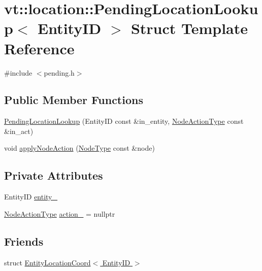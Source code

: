 \hypertarget{structvt_1_1location_1_1_pending_location_lookup}{}\section{vt\+:\+:location\+:\+:Pending\+Location\+Lookup$<$ Entity\+ID $>$ Struct Template Reference}
\label{structvt_1_1location_1_1_pending_location_lookup}


{\ttfamily \#include $<$pending.\+h$>$}

\subsection*{Public Member Functions}
\begin{DoxyCompactItemize}
\item 
\hyperlink{structvt_1_1location_1_1_pending_location_lookup_a31dee6a196bcc0fee50bdb983497b1f5}{Pending\+Location\+Lookup} (Entity\+ID const \&in\+\_\+entity, \hyperlink{namespacevt_1_1location_a3a9235e0ceb341bef225d2cc46606e9e}{Node\+Action\+Type} const \&in\+\_\+act)
\item 
void \hyperlink{structvt_1_1location_1_1_pending_location_lookup_a8e23682547f207d5403a0ee6a2224f37}{apply\+Node\+Action} (\hyperlink{namespacevt_a866da9d0efc19c0a1ce79e9e492f47e2}{Node\+Type} const \&node)
\end{DoxyCompactItemize}
\subsection*{Private Attributes}
\begin{DoxyCompactItemize}
\item 
Entity\+ID \hyperlink{structvt_1_1location_1_1_pending_location_lookup_ac35da0e44b6048e6cc893f1498f1aa1d}{entity\+\_\+}
\item 
\hyperlink{namespacevt_1_1location_a3a9235e0ceb341bef225d2cc46606e9e}{Node\+Action\+Type} \hyperlink{structvt_1_1location_1_1_pending_location_lookup_a601536844f9545be1cdf913fcd49d393}{action\+\_\+} = nullptr
\end{DoxyCompactItemize}
\subsection*{Friends}
\begin{DoxyCompactItemize}
\item 
struct \hyperlink{structvt_1_1location_1_1_pending_location_lookup_abf8115ee4795af8b482a657aa6195a6a}{Entity\+Location\+Coord$<$ Entity\+I\+D $>$}
\end{DoxyCompactItemize}


